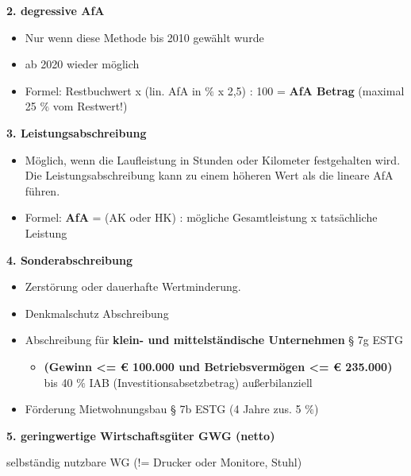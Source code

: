 \textbf{2. degressive AfA}

\begin{itemize}
\item
  Nur wenn diese Methode bis 2010 gewählt wurde
\item
  ab 2020 wieder möglich
\item
  Formel: Restbuchwert x (lin. AfA in $\%$ x 2,5) : 100 = \textbf{AfA
  Betrag} (maximal 25 $\%$ vom Restwert!)
\end{itemize}

\textbf{3. Leistungsabschreibung}

\begin{itemize}
\item
  Möglich, wenn die Laufleistung in Stunden oder Kilometer festgehalten
  wird. Die Leistungsabschreibung kann zu einem höheren Wert als die
  lineare AfA führen.
\item
  Formel: \textbf{AfA} = (AK oder HK) : mögliche Gesamtleistung x
  tatsächliche Leistung
\end{itemize}

\textbf{4. Sonderabschreibung}

\begin{itemize}
\item
  Zerstörung oder dauerhafte Wertminderung.
\item
  Denkmalschutz Abschreibung
\item
  Abschreibung für \textbf{klein- und mittelständische Unternehmen} § 7g
  ESTG

  \begin{itemize}
  \item
    \textbf{(Gewinn \textless= € 100.000 und Betriebsvermögen \textless=
    € 235.000)} bis 40 $\%$ IAB (Investitionsabsetzbetrag)
    außerbilanziell
  \end{itemize}
\item
  Förderung Mietwohnungsbau § 7b ESTG (4 Jahre zus. 5 $\%$)
\end{itemize}

\textbf{5. geringwertige Wirtschaftsgüter GWG (netto)}

selbständig nutzbare WG (!= Drucker oder Monitore, Stuhl)

